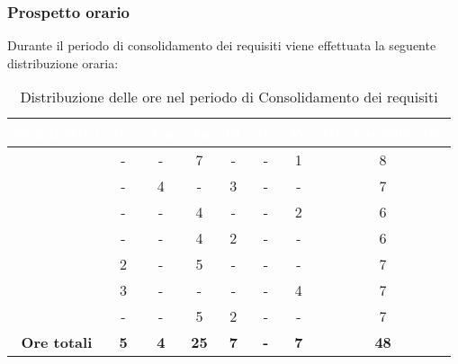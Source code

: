 \subsubsection{Prospetto orario}
Durante il periodo di consolidamento dei requisiti viene effettuata la seguente distribuzione oraria:
\begin{table}[H]
	\begin{center}
		\begin{tabular}{ c c c c c c c c }
		\rowcolor{darkblue} 
		\textcolor{white}{\textbf{Nominativo}} & \textcolor{white}{\textbf{Re}} & \textcolor{white}{\textbf{Am}} & \textcolor{white}{\textbf{An}} & \textcolor{white}{\textbf{Pt}} & \textcolor{white}{\textbf{Pr}} & \textcolor{white}{\textbf{Ve}} & \textcolor{white}{\textbf{Ore Complessive}} \\ \hline
		\BL & -  & -  & 7 & - & - & 1 & 8 \\ \hline
		\FF & -  & 4  & - & 3 & - & -  & 7 \\ \hline
		\MM & -  & -  & 4 & - & - & 2  & 6 \\ \hline
		\PC & - & -  & 4 & 2 & - & - & 6 \\ \hline
		\TG & 2  & - & 5 & - & - & - & 7 \\ \hline
		\TL & 3  & - & - & - & - & 4 & 7 \\ \hline
		\VD & -  & -  & 5 & 2 & - & -  & 7 \\ \hline
		\textbf{Ore totali} & \textbf{5} & \textbf{4} & \textbf{25} & \textbf{7} & \textbf{-} & \textbf{7} & \textbf{48} \\ \hline
		\end{tabular}
	\caption{Distribuzione delle ore nel periodo di Consolidamento dei requisiti}
	\end{center}
\end{table}
